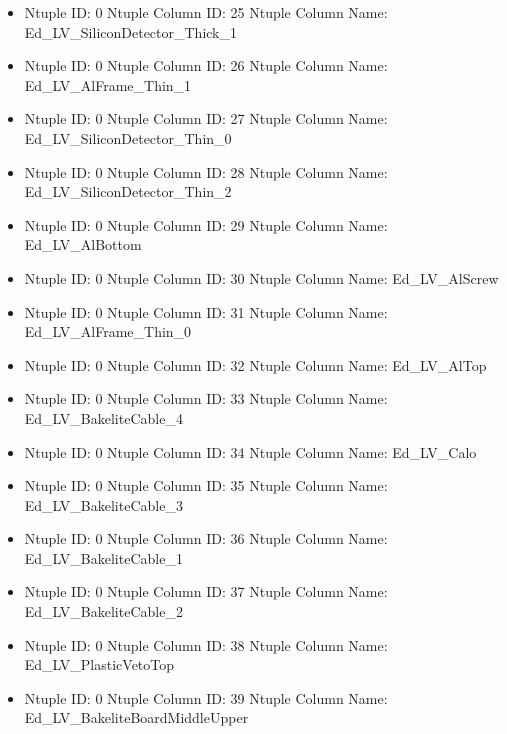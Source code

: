 \documentclass[8pt]{beamer}
\begin{document}
\begin{frame}
\begin{itemize}
        \item Ntuple ID: 0 Ntuple Column ID: 25 Ntuple Column Name: Ed\_LV\_SiliconDetector\_Thick\_1
        
        \item Ntuple ID: 0 Ntuple Column ID: 26 Ntuple Column Name: Ed\_LV\_AlFrame\_Thin\_1
        
        \item Ntuple ID: 0 Ntuple Column ID: 27 Ntuple Column Name: Ed\_LV\_SiliconDetector\_Thin\_0
        
        \item Ntuple ID: 0 Ntuple Column ID: 28 Ntuple Column Name: Ed\_LV\_SiliconDetector\_Thin\_2
        
        \item Ntuple ID: 0 Ntuple Column ID: 29 Ntuple Column Name: Ed\_LV\_AlBottom
        
        \item Ntuple ID: 0 Ntuple Column ID: 30 Ntuple Column Name: Ed\_LV\_AlScrew
        
        \item Ntuple ID: 0 Ntuple Column ID: 31 Ntuple Column Name: Ed\_LV\_AlFrame\_Thin\_0
        
        \item Ntuple ID: 0 Ntuple Column ID: 32 Ntuple Column Name: Ed\_LV\_AlTop
        
        \item Ntuple ID: 0 Ntuple Column ID: 33 Ntuple Column Name: Ed\_LV\_BakeliteCable\_4
        
        \item Ntuple ID: 0 Ntuple Column ID: 34 Ntuple Column Name: Ed\_LV\_Calo
        
        \item Ntuple ID: 0 Ntuple Column ID: 35 Ntuple Column Name: Ed\_LV\_BakeliteCable\_3
        
        \item Ntuple ID: 0 Ntuple Column ID: 36 Ntuple Column Name: Ed\_LV\_BakeliteCable\_1
        
        \item Ntuple ID: 0 Ntuple Column ID: 37 Ntuple Column Name: Ed\_LV\_BakeliteCable\_2
        
        \item Ntuple ID: 0 Ntuple Column ID: 38 Ntuple Column Name: Ed\_LV\_PlasticVetoTop
        
        \item Ntuple ID: 0 Ntuple Column ID: 39 Ntuple Column Name: Ed\_LV\_BakeliteBoardMiddleUpper
        

\end{itemize}
\end{frame}
\end{document}
